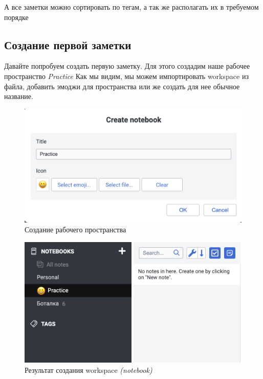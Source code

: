 \documentclass[12pt, a4paper]{article}
\begin{document}
    А все заметки можно сортировать по тегам, а так же располагать их в требуемом порядке

    \newpage
    \subsection{Создание первой заметки}
    Давайте попробуем создать первую заметку. Для этого создадим наше рабочее
    пространство \textit{Practice}
    Как мы видим, мы можем импортировать workspace из файла, добавить эмоджи для пространства
    или же создать для нее обычное название.
    \begin{figure}[H]
        \centering
        \includegraphics[width=0.75\linewidth]{src/2.png}
        \caption{Создание рабочего пространства}
    \end{figure}
    \begin{figure}[H]
        \centering
        \includegraphics[width=0.75\linewidth]{src/3.png}
        \caption{Результат создания workspace \textit{(notebook)}}
    \end{figure}
    
\end{document}
